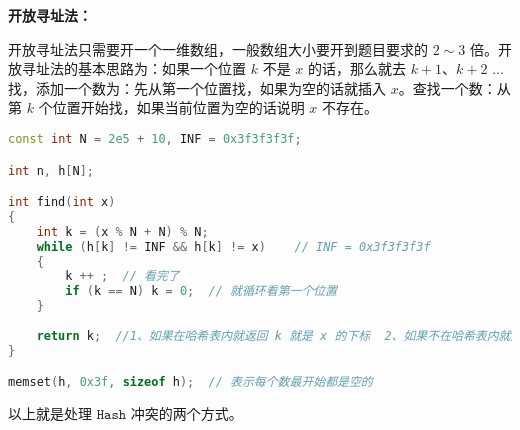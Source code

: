 \textbf{开放寻址法：}

开放寻址法只需要开一个一维数组，一般数组大小要开到题目要求的 $2 \sim 3$ 倍。开放寻址法的基本思路为：如果一个位置 $k$ 不是 $x$ 的话，那么就去 $k + 1$、$k + 2$ ... 找，添加一个数为：先从第一个位置找，如果为空的话就插入 $x$。查找一个数：从第 $k$ 个位置开始找，如果当前位置为空的话说明 $x$ 不存在。

\begin{lstlisting}[language=cpp]
const int N = 2e5 + 10, INF = 0x3f3f3f3f;

int n, h[N];

int find(int x)
{
    int k = (x % N + N) % N;
    while (h[k] != INF && h[k] != x)    // INF = 0x3f3f3f3f
    {
        k ++ ;  // 看完了 
        if (k == N) k = 0;  // 就循环看第一个位置
    }
    
    return k;  //1、如果在哈希表内就返回 k 就是 x 的下标  2、如果不在哈希表内就返回应该存储的位置
}

memset(h, 0x3f, sizeof h);  // 表示每个数最开始都是空的
\end{lstlisting}

以上就是处理 $\mathtt{Hash}$ 冲突的两个方式。